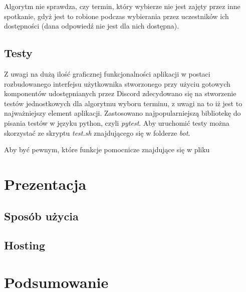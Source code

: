 \documentclass[12pt,a4paper]{article}
\begin{document}
Algorytm nie sprawdza, czy termin, który wybierze nie jest zajęty przez inne spotkanie, gdyż jest to robione podczas wybierania przez uczestników ich dostępności (dana odpowiedź nie jest dla nich dostępna).

\subsection{Testy}

Z uwagi na dużą ilość graficznej funkcjonalności aplikacji w postaci rozbudowanego interfejsu użytkownika stworzonego przy użyciu gotowych komponentów udostępnianych przez Discord zdecydowano się na stworzenie testów jednostkowych dla algorytmu wyboru terminu, z uwagi na to iż jest to najważniejszy element aplikacji. Zastosowano najpopularniejszą bibliotekę do pisania testów w języku python, czyli \textit{pytest}. Aby uruchomić testy można skorzystać ze skryptu \textit{test.sh} znajdującego się w folderze \textit{bot}. 

Aby być pewnym, które funkcje pomocnicze znajdujące się w pliku 

\section{Prezentacja}

\subsection{Sposób użycia}

\subsection{Hosting}

\section*{Podsumowanie}

\printbibliography[title={Bibliografia}]
\end{document}
